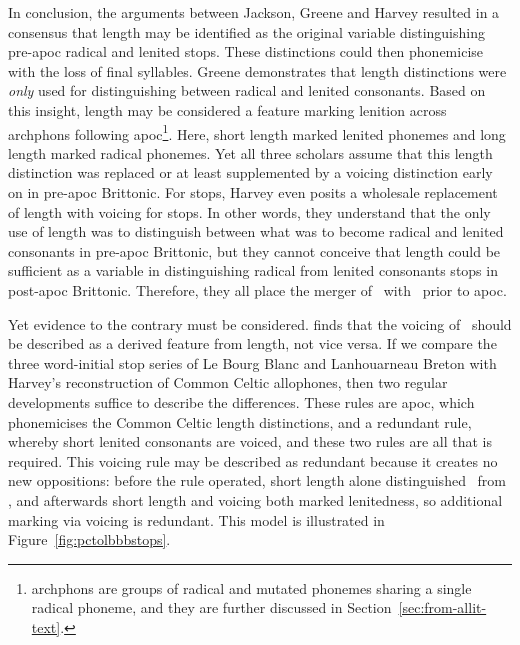 In conclusion, the arguments between Jackson, Greene and Harvey resulted in a consensus that length may be identified as the original variable distinguishing pre-\gls{apoc} radical and lenited stops. These distinctions could then phonemicise with the loss of final syllables. Greene demonstrates that length distinctions were \emph{only} used for distinguishing between radical and lenited consonants. Based on this insight, length may be considered a feature marking lenition across \gls{archphon}s following \gls{apoc}\footnote{\Gls{archphon}s are groups of radical and mutated phonemes sharing a single radical phoneme, and they are further discussed in Section~\ref{sec:from-allit-text}.}. Here, short length marked lenited phonemes and long length marked radical phonemes. Yet all three scholars assume that this length distinction was replaced or at least supplemented by a voicing distinction early on in pre-\gls{apoc} Brittonic. For stops, Harvey even posits a wholesale replacement of length with voicing for stops. In other words, they understand that the only use of length was to distinguish between what was to become radical and lenited consonants in pre-\gls{apoc} Brittonic, but they cannot conceive that length could be sufficient as a variable in distinguishing radical from lenited consonants stops in post-\gls{apoc} Brittonic. Therefore, they all place the merger of \lT\ with \xD\ prior to \gls{apoc}.

Yet evidence to the contrary must be considered. \Textcite{carlyle_syllabic_1988} finds that the voicing of \lT\ should be described as a derived feature from length, not vice versa. If we compare the three word-initial stop series of Le Bourg Blanc and Lanhouarneau Breton with Harvey's reconstruction of Common Celtic allophones, then two regular developments suffice to describe the differences. These rules are \gls{apoc}, which phonemicises the Common Celtic length distinctions, and a redundant rule, whereby short \ie lenited consonants are voiced, and these two rules are all that is required. This voicing rule may be described as redundant because it creates no new oppositions: before the rule operated, short length alone distinguished \lT\ from \xT, and afterwards short length and voicing both marked lenitedness, so additional marking via voicing is redundant. This model is illustrated in Figure~\ref{fig:pctolbbbstops}.

